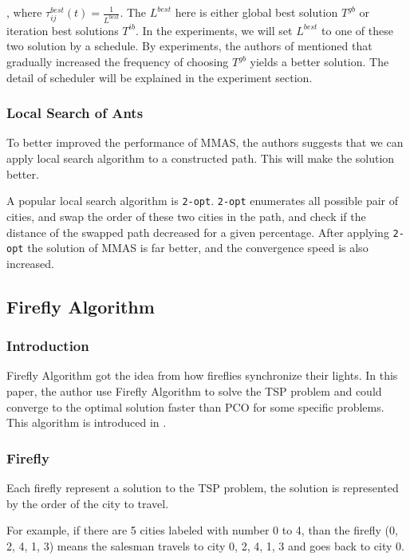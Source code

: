 \documentclass[twocolumn, a4paper]{extarticle}
\begin{document}
, where $\tau_{i j}^{best}(t) = \frac{1}{L^{best}}$. The $L^{best}$ here is either global best solution $T^{gb}$ or iteration best solutions $T^{ib}$. In the experiments, we will set $L^{best}$ to one of these two solution by a schedule. By experiments, the authors of \cite{stutzle1999aco} mentioned that gradually increased the frequency of choosing $T^{gb}$ yields a better solution. The detail of scheduler will be explained in the experiment section.

\subsubsection{Local Search of Ants}

To better improved the performance of MMAS, the authors suggests that we can apply local search algorithm to a constructed path. This will make the solution better.

A popular local search algorithm is \texttt{2-opt}. \texttt{2-opt} enumerates all possible pair of cities, and swap the order of these two cities in the path, and check if the distance of the swapped path decreased for a given percentage. After applying \texttt{2-opt} the solution of MMAS is far better, and the convergence speed is also increased.


\subsection{Firefly Algorithm}

\subsubsection{Introduction}
Firefly Algorithm got the idea from how fireflies synchronize their lights. In this paper, the author use Firefly Algorithm to solve the TSP problem and could converge to the optimal solution faster than PCO for some specific problems. This algorithm is introduced in \cite{jati2011evolutionary}.

\subsubsection{Firefly}
Each firefly represent a solution to the TSP problem, the solution is represented by the order of the city to travel.

For example, if there are 5 cities labeled with number 0 to 4, than the firefly (0, 2, 4, 1, 3) means the salesman travels to city 0, 2, 4, 1, 3 and goes back to city 0.
\end{document}
